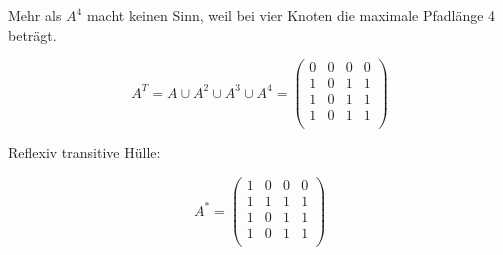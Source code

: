 \begin{itemize}
Mehr als $A^{4}$ macht keinen Sinn, weil bei vier Knoten die maximale Pfadlänge 4 beträgt.

\begin{equation}
	A^{T} = A \cup A^{2} \cup A^{3} \cup A^{4} = 
	\left( \begin{array}{rrrr}
	0 & 0 & 0 & 0 \\
	1 & 0 & 1 & 1 \\
	1 & 0 & 1 & 1 \\
	1 & 0 & 1 & 1 \\
	\end{array}\right)
\end{equation}

Reflexiv transitive Hülle:

\begin{equation}
	A^{\ast} =
	\left( \begin{array}{rrrr}
	1 & 0 & 0 & 0 \\
	1 & 1 & 1 & 1 \\
	1 & 0 & 1 & 1 \\
	1 & 0 & 1 & 1 \\
	\end{array}\right)
\end{equation}
\end{itemize}